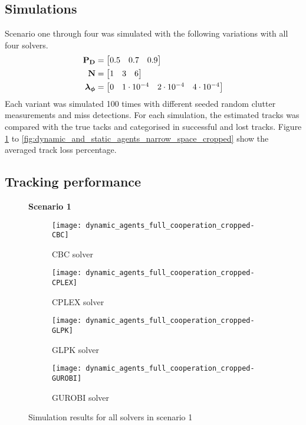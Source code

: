 \subsection{Simulations}
Scenario one through four was simulated with the following variations with all four solvers.
\begin{equation*}
\begin{split}
\boldsymbol{\mathbf{P_D}} &= \begin{bmatrix} 0.5 & 0.7 & 0.9 \end{bmatrix} \\
\boldsymbol{\mathbf{N}} &=\begin{bmatrix} 1 & 3 & 6 \end{bmatrix} \\
\boldsymbol{\mathbf{\lambda_\phi}} &=\begin{bmatrix} 0 & 1\cdot10^{-4} & 2\cdot10^{-4} & 4\cdot10^{-4} \end{bmatrix}
\end{split}
\end{equation*}
Each variant was simulated 100 times with different seeded random clutter measurements and miss detections. For each simulation, the estimated tracks was compared with the true tacks and categorised in successful and lost tracks. Figure \ref{fig:dynamic_agents_full_cooperation_cropped} to \ref{fig:dynamic_and_static_agents_narrow_space_cropped} show the averaged track loss percentage.

\subsection{Tracking performance}
\begin{figure}[H]
    \centering
    \textbf{Scenario 1}\par \medskip
    \begin{subfigure}{0.49\textwidth}
        \centering
        \texttt{[image: dynamic\_agents\_full\_cooperation\_cropped-CBC]}
        \caption{CBC solver}
    \end{subfigure}
    \begin{subfigure}{0.49\textwidth}
        \centering
        \texttt{[image: dynamic\_agents\_full\_cooperation\_cropped-CPLEX]}
        \caption{CPLEX solver}
    \end{subfigure}
    \begin{subfigure}{0.49\textwidth}
        \centering
        \texttt{[image: dynamic\_agents\_full\_cooperation\_cropped-GLPK]}
        \caption{GLPK solver}
    \end{subfigure}
    \begin{subfigure}{0.49\textwidth}
        \centering
        \texttt{[image: dynamic\_agents\_full\_cooperation\_cropped-GUROBI]}
        \caption{GUROBI solver}
    \end{subfigure}
	\label{fig:dynamic_agents_full_cooperation_cropped}
	\caption{Simulation results for all solvers in scenario 1}
\end{figure}

